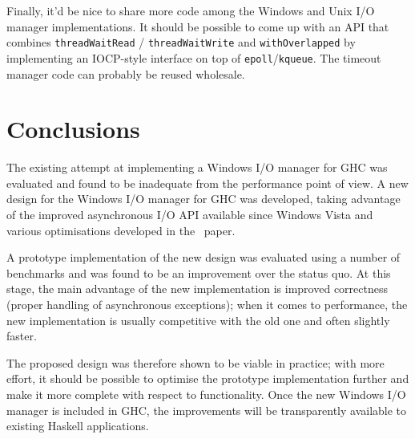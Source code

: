 \documentclass[a4paper,11pt,oneside]{report}
\begin{document}
Finally, it'd be nice to share more code among the Windows and Unix I/O manager
implementations.  It should be possible to come up with an API that combines
\texttt{threadWaitRead} / \texttt{threadWaitWrite} and \texttt{withOverlapped}
by implementing an IOCP-style interface on top of
\texttt{epoll}/\texttt{kqueue}. The timeout manager code can probably be reused
wholesale.




\chapter{Conclusions}
\label{chap:conclusions}

The existing attempt at implementing a Windows I/O manager for GHC was evaluated
and found to be inadequate from the performance point of view. A new design for
the Windows I/O manager for GHC was developed, taking advantage of the improved
asynchronous I/O API available since Windows Vista and various optimisations
developed in the~\cite{bib:voellmy} paper.

A prototype implementation of the new design was evaluated using a number of
benchmarks and was found to be an improvement over the status quo. At this
stage, the main advantage of the new implementation is improved correctness
(proper handling of asynchronous exceptions); when it comes to performance, the
new implementation is usually competitive with the old one and often slightly
faster.

The proposed design was therefore shown to be viable in practice; with more
effort, it should be possible to optimise the prototype implementation further
and make it more complete with respect to functionality. Once the new Windows
I/O manager is included in GHC, the improvements will be transparently available
to existing Haskell applications.
\end{document}
